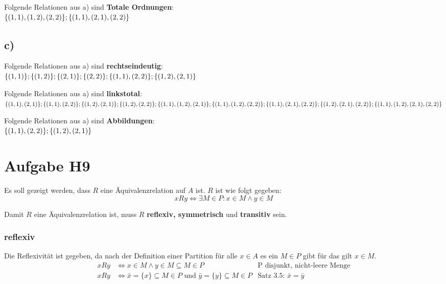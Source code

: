 \documentclass[11pt,a4paper]{article}
\begin{document}
Folgende Relationen aus a) sind \textbf{Totale Ordnungen}: \\
\begin{math}
\{ (1,1), (1,2), (2,2) \} ; \{ (1,1), (2,1), (2,2) \} \\
\end{math}

\subsection*{c)}

Folgende Relationen aus a) sind \textbf{rechtseindeutig}: \\
\begin{math}
\{ (1,1) \} ; \{ (1,2) \} ; \{ (2,1) \} ; \{ (2,2) \} ; \\
\{ (1,1), (2,2) \} ; \{ (1,2), (2,1) \} \\
\end{math}

Folgende Relationen aus a) sind \textbf{linkstotal}: \\
\begin{math}
\{ (1,1), (2,1) \} ; \{ (1,1), (2,2) \} ; \{ (1,2), (2,1) \} ; \{ (1,2), (2,2) \} ; \\
\{ (1,1), (1,2), (2,1) \} ; \{ (1,1), (1,2), (2,2) \} ; \{ (1,1), (2,1), (2,2) \} ; \{ (1,2), (2,1), (2,2) \} ; \\
\{ (1,1), (1,2), (2,1), (2,2)\} \\
\end{math}

Folgende Relationen aus a) sind \textbf{Abbildungen}: \\
\begin{math}
\{ (1,1), (2,2) \} ; \{ (1,2), (2,1) \} \\
\end{math}


\section*{Aufgabe H9}
Es soll gezeigt werden, dass \(R\) eine Äquivalenzrelation auf \(A\) ist. \(R\) ist wie folgt gegeben:
\begin{equation*}
xRy \Leftrightarrow \exists M \in P: x \in M \land y \in M
\end{equation*}

Damit \(R\) eine Äquivalenzrelation ist, muss \(R\) \textbf{reflexiv, symmetrisch} und \textbf{transitiv} sein.

\subsubsection*{reflexiv}
Die Reflexivität ist gegeben, da nach der Definition einer Partition für alle \(x \in A\) es ein \(M \in P\) gibt für das gilt \(x \in M\).
\begin{align*}
xRy & \Leftrightarrow x \in M \land y \in M \subseteq M \in P  & \text{P disjunkt, nicht-leere Menge}\\
xRy & \Leftrightarrow \bar{x} = \{x\} \subseteq M \in P \text{~und~} \bar{y} = \{y\} \subseteq M \in P & \text{Satz 3.5:~}\bar{x} = \bar{y} \\
\end{align*}
\end{document}
